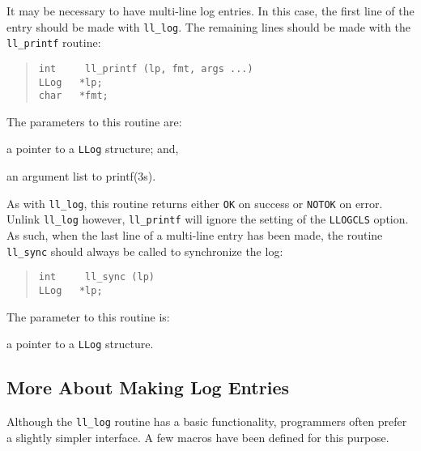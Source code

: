 It may be necessary to have multi-line log entries.
In this case, the first line of the entry should be made with \verb"ll_log".
The remaining lines should be made with the \verb"ll_printf" routine:
\begin{quote}\small\begin{verbatim}
int     ll_printf (lp, fmt, args ...)
LLog   *lp;
char   *fmt;
\end{verbatim}
\end{quote}
The parameters to this routine are:
\begin{describe}
\item[\verb"lp":] a pointer to a \verb"LLog" structure; and,

\item[\verb"fmt"/\verb"args ...":] an argument list to \man printf(3s).
\end{describe}
As with \verb"ll_log", this routine returns either \verb"OK" on success or
\verb"NOTOK" on error.
Unlink \verb"ll_log" however,
\verb"ll_printf" will ignore the setting of the \verb"LLOGCLS" option.
As such, when the last line of a multi-line entry has been made,
the routine \verb"ll_sync" should always be called to synchronize the log:
\begin{quote}\small\begin{verbatim}
int     ll_sync (lp)
LLog   *lp;
\end{verbatim}
\end{quote}
The parameter to this routine is:
\begin{describe}
\item[\verb"lp":] a pointer to a \verb"LLog" structure.
\end{describe}

\subsection	{More About Making Log Entries}
Although the \verb"ll_log" routine has a basic functionality,
programmers often prefer a slightly simpler interface.
A few macros have been defined for this purpose.

